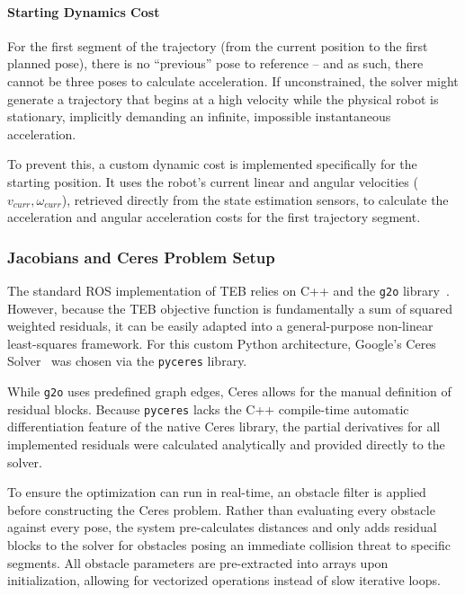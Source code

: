 \paragraph{Starting Dynamics Cost}

For the first segment of the trajectory (from the current position to the first planned pose), there is no ``previous'' pose to reference -- and as such, there cannot be three poses to calculate acceleration. If unconstrained, the solver might generate a trajectory that begins at a high velocity while the physical robot is stationary, implicitly demanding an infinite, impossible instantaneous acceleration.

To prevent this, a custom dynamic cost is implemented specifically for the starting position. It uses the robot's current linear and angular velocities ($v_{curr}, \omega_{curr}$), retrieved directly from the state estimation sensors, to calculate the acceleration and angular acceleration costs for the first trajectory segment.

\subsubsection{Jacobians and Ceres Problem Setup}
\label{subsubsec:ceres-setup}
The standard ROS implementation of TEB relies on C++ and the \texttt{g2o} library~\cite{kummerle2011g2o}. However, because the TEB objective function is fundamentally a sum of squared weighted residuals, it can be easily adapted into a general-purpose non-linear least-squares framework. For this custom Python architecture, Google's Ceres Solver~\cite{agarwal2012ceres} was chosen via the \texttt{pyceres} library.

While \texttt{g2o} uses predefined graph edges, Ceres allows for the manual definition of residual blocks. Because \texttt{pyceres} lacks the C++ compile-time automatic differentiation feature of the native Ceres library, the partial derivatives for all implemented residuals were calculated analytically and provided directly to the solver.

To ensure the optimization can run in real-time, an obstacle filter is applied before constructing the Ceres problem. Rather than evaluating every obstacle against every pose, the system pre-calculates distances and only adds residual blocks to the solver for obstacles posing an immediate collision threat to specific segments. All obstacle parameters are pre-extracted into arrays upon initialization, allowing for vectorized operations instead of slow iterative loops.

